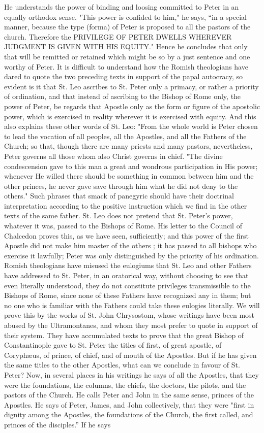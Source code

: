 He understands the power of binding and loosing committed to Peter in an equally orthodox sense. "This power is confided to him," he says, “in a special manner, because the type (forma) of Peter is proposed to all the pastors of the church. Therefore the PRIVILEGE OF PETER DWELLS WHEREVER JUDGMENT IS GIVEN WITH HIS EQUITY." Hence he concludes that only that will be remitted or retained which might be so by a just sentence and one worthy of Peter. It is difficult to understand how the Romish theologians have dared to quote the two preceding texts in support of the papal autocracy, so evident is it that St. Leo ascribes to St. Peter only a primacy, or rather a priority of ordination, and that instead of ascribing to the Bishop of Rome only, the power of Peter, be regards that Apostle only as the form or figure of the apostolic power, which is exercised in reality wherever it is exercised with equity. And this also explains these other words of St. Leo: "From the whole world is Peter chosen to lead the vocation of all peoples, all the Apostles, and all the Fathers of the Church; so that, though there are many priests and many pastors, nevertheless, Peter governs all those whom also Christ governs in chief. "The divine condescension gave to this man a great and wondrous participation in His power; whenever He willed there should be something in common between him and the other princes, he never gave save through him what he did not deny to the others." Such phrases that smack of panegyric should have their doctrinal interpretation according to the positive instruction which we find in the other texts of the same father. St. Leo does not pretend that St. Peter's power, whatever it was, passed to the Bishops of Rome. His letter to the Council of Chalcedon proves this, as we have seen, sufficiently; and this power of the first Apostle did not make him master of the others ; it has passed to all bishops who exercise it lawfully; Peter was only distinguished by the priority of his ordination. Romish theologians have misused the eulogiums that St. Leo and other Fathers have addressed to St. Peter, in an oratorical way, without choosing to see that even literally understood, they do not constitute privileges transmissible to the Bishops of Rome, since none of these Fathers have recognized any in them; but no one who is familiar with the Fathers could take these eulogies literally. We will prove this by the works of St. John Chrysostom, whose writings have been most abused by the Ultramontanes, and whom they most prefer to quote in support of their system. They have accumulated texts to prove that the great Bishop of Constantinople gave to St. Peter the titles of first, of great apostle, of Coryphæus, of prince, of chief, and of mouth of the Apostles. But if he has given the same titles to the other Apostles, what can we conclude in favour of St. Peter? Now, in several places in his writings he says of all the Apostles, that they were the foundations, the columns, the chiefs, the doctors, the pilots, and the pastors of the Church. He calls Peter and John in the same sense, princes of the Apostles. He says of Peter, James, and John collectively, that they were "first in dignity among the Apostles, the foundations of the Church, the first called, and princes of the disciples.” If he says 